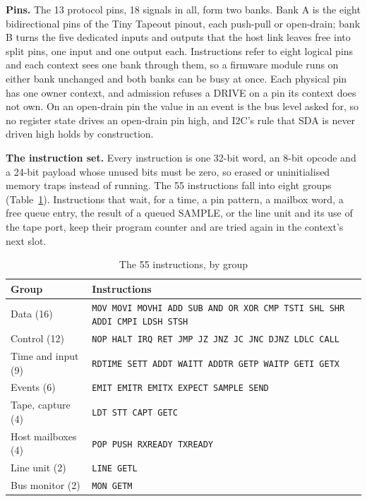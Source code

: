 \documentclass[conference,letterpaper]{IEEEtran}
\newcommand{\ins}[1]{\texttt{#1}}
\begin{document}
\textbf{Pins.} The 13 protocol pins, 18 signals in all, form two banks. Bank A is the eight bidirectional
pins of the Tiny Tapeout pinout, each push-pull or open-drain; bank B turns the five
dedicated inputs and outputs that the host link leaves free into split pins, one input
and one output each. Instructions refer to eight logical pins and each context sees one
bank through them, so a firmware module runs on either bank unchanged and both banks can
be busy at once. Each physical pin has one owner context, and admission refuses a DRIVE
on a pin its context does not own. On an open-drain pin the value in an event is the bus
level asked for, so no register state drives an open-drain pin high, and I2C's rule that
SDA is never driven high holds by construction.

\textbf{The instruction set.} Every instruction is one 32-bit word, an 8-bit opcode and a
24-bit payload whose unused bits must be zero, so erased or uninitialised memory traps
instead of running. The 55 instructions fall into eight groups
(Table~\ref{tab:isa}). Instructions that wait, for a time, a pin pattern, a mailbox word,
a free queue entry, the result of a queued SAMPLE, or the line unit and its use of the
tape port, keep their program counter and are tried again in the context's
next slot.

\begin{table}[t]
\centering
\caption{The 55 instructions, by group}
\label{tab:isa}
\footnotesize
\begin{tabular}{@{}p{}p{}@{}}
\toprule
Group & Instructions \\
\midrule
Data (16) & \ins{MOV MOVI MOVHI ADD SUB AND OR XOR CMP TSTI SHL SHR ADDI CMPI LDSH STSH} \\
Control (12) & \ins{NOP HALT IRQ RET JMP JZ JNZ JC JNC DJNZ LDLC CALL} \\
Time and input (9) & \ins{RDTIME SETT ADDT WAITT ADDTR GETP WAITP GETI GETX} \\
Events (6) & \ins{EMIT EMITR EMITX EXPECT SAMPLE SEND} \\
Tape, capture (4) & \ins{LDT STT CAPT GETC} \\
Host mailboxes (4) & \ins{POP PUSH RXREADY TXREADY} \\
Line unit (2) & \ins{LINE GETL} \\
Bus monitor (2) & \ins{MON GETM} \\
\bottomrule
\end{tabular}
\end{table}
\end{document}
